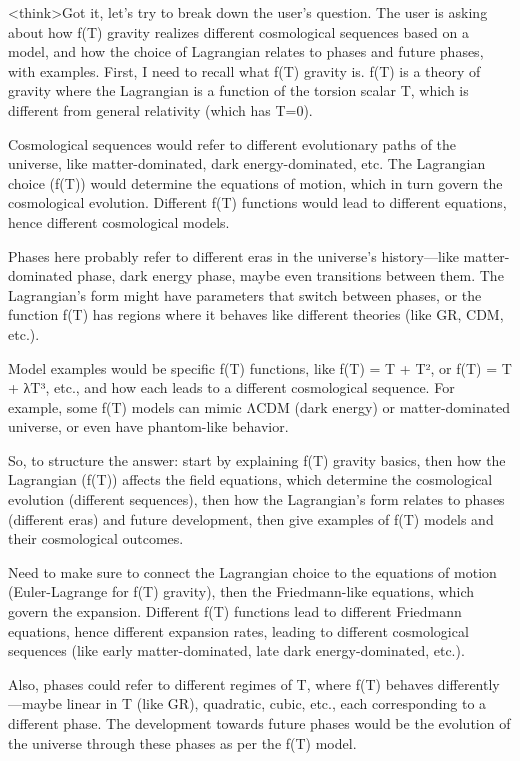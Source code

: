 <think>Got it, let's try to break down the user's question. The user is asking about how f(T) gravity realizes different cosmological sequences based on a model, and how the choice of Lagrangian relates to phases and future phases, with examples. First, I need to recall what f(T) gravity is. f(T) is a theory of gravity where the Lagrangian is a function of the torsion scalar T, which is different from general relativity (which has T=0). 

Cosmological sequences would refer to different evolutionary paths of the universe, like matter-dominated, dark energy-dominated, etc. The Lagrangian choice (f(T)) would determine the equations of motion, which in turn govern the cosmological evolution. Different f(T) functions would lead to different equations, hence different cosmological models. 

Phases here probably refer to different eras in the universe's history—like matter-dominated phase, dark energy phase, maybe even transitions between them. The Lagrangian's form might have parameters that switch between phases, or the function f(T) has regions where it behaves like different theories (like GR, CDM, etc.). 

Model examples would be specific f(T) functions, like f(T) = T + T², or f(T) = T + λT³, etc., and how each leads to a different cosmological sequence. For example, some f(T) models can mimic ΛCDM (dark energy) or matter-dominated universe, or even have phantom-like behavior. 

So, to structure the answer: start by explaining f(T) gravity basics, then how the Lagrangian (f(T)) affects the field equations, which determine the cosmological evolution (different sequences), then how the Lagrangian's form relates to phases (different eras) and future development, then give examples of f(T) models and their cosmological outcomes. 

Need to make sure to connect the Lagrangian choice to the equations of motion (Euler-Lagrange for f(T) gravity), then the Friedmann-like equations, which govern the expansion. Different f(T) functions lead to different Friedmann equations, hence different expansion rates, leading to different cosmological sequences (like early matter-dominated, late dark energy-dominated, etc.). 

Also, phases could refer to different regimes of T, where f(T) behaves differently—maybe linear in T (like GR), quadratic, cubic, etc., each corresponding to a different phase. The development towards future phases would be the evolution of the universe through these phases as per the f(T) model. 


